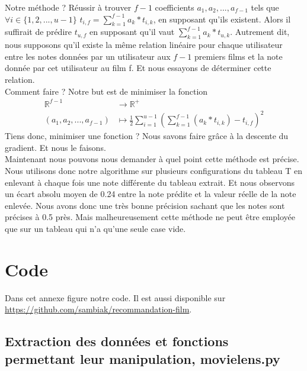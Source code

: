 \documentclass[a4paper,10pt]{article}
\newenvironment{changemargin}[2]{\begin{list}{}{%
\setlength{\topsep}{0pt}%
\setlength{\leftmargin}{0pt}%
\setlength{\rightmargin}{0pt}%
\setlength{\listparindent}{\parindent}%
\setlength{\itemindent}{\parindent}%
\setlength{\parsep}{0pt plus 1pt}%
\addtolength{\leftmargin}{#1}%
\addtolength{\rightmargin}{#2}%
}\item }{\end{list}}
\begin{document}
Notre méthode ? Réussir à trouver $f-1$ coefficients $a_1, a_2, ..., a_{f-1}$ tels que $\forall i \in \{1, 2, ..., u-1\}$ $t_{i, f} = \sum_{k = 1}^{f-1} a_k * t_{i, k}$, en supposant qu'ils existent. Alors il suffirait de prédire $t_{u, f}$ en supposant qu'il vaut $\sum_{k = 1}^{f-1} a_k * t_{u, k}$. Autrement dit, nous supposons qu'il existe la même relation linéaire pour chaque utilisateur entre les notes données par un utilisateur aux $f- 1$ premiers films et la note donnée par cet utilisateur au film f. Et nous essayons de déterminer cette relation.\\

Comment faire ? Notre but est de minimiser la fonction
\begin{align*}
\mathbb{R}^{f-1}&\longrightarrow \mathbb{R}^+\\ 
(a_1, a_2, ..., a_{f-1})&\longmapsto \frac{1}{2}\sum_{i = 1}^{u - 1} (\sum_{k = 1}^{f-1} (a_k * t_{i, k}) - t_{i, f})^2
\end{align*}
Tiens donc, minimiser une fonction ? Nous savons faire grâce à la descente du gradient. Et nous le faisons.\\

Maintenant nous pouvons nous demander à quel point cette méthode est précise. Nous utilisons donc notre algorithme sur plusieurs configurations du tableau T en enlevant à chaque fois une note différente du tableau extrait. Et nous observons un écart absolu moyen de 0.24 entre la note prédite et la valeur réelle de la note enlevée. Nous avons donc une très bonne précision sachant que les notes sont précises à 0.5 près. Mais malheureusement cette méthode ne peut être employée que sur un tableau qui n'a qu'une seule case vide.

\newpage

\section{Code} 
 
Dans cet annexe figure notre code. Il est aussi disponible sur \url{https://github.com/sambiak/recommandation-film}.

\subsection{Extraction des données et fonctions permettant leur manipulation, movielens.py} 
\begin{changemargin}{-4cm}{0cm} 
 
\end{changemargin} 
 
\end{document}
